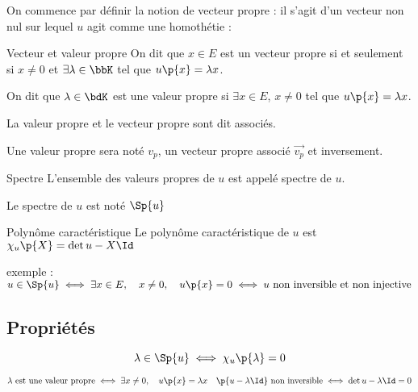 \documentclass[a4paper,french,bookmarks]{book}
\begin{document}
    On commence par définir la notion de vecteur propre : il s'agit d'un vecteur non nul sur lequel $u$ agit comme une homothétie :
    \begin{definition}{Vecteur et valeur propre}{}
        On dit que $x \in E$ est un vecteur propre si et seulement si $x \neq 0$ et $\exists \lambda \in \bbK$ tel que $u\p{x} = \lambda x$.
        
        On dit que $\lambda \in \bdK$ est une valeur propre si $\exists x \in E$, $x \neq 0$ tel que $u\p{x} = \lambda x$.
        
        La valeur propre et le vecteur propre sont dit associés.
    \end{definition}
    \begin{notation}
        Une valeur propre sera noté $v_p$, un vecteur propre associé $\vec{v_p}$ et inversement.
    \end{notation}
    
    \begin{definition}{Spectre}
        L'ensemble des valeurs propres de $u$ est appelé spectre de $u$.
    \end{definition}
    
    \begin{notation}
        Le spectre de $u$ est noté $\Sp{u}$
    \end{notation}
    
    \begin{definition}{Polynôme caractéristique}{}
        Le polynôme caractéristique de $u$ est $\chi_u\p{X} = \det{u - X\Id}$
    \end{definition}
    
    exemple : $u \in \Sp{u} \iff \exists x \in E,\quad x \neq 0,\quad u\p{x} = 0\iff u \ \text{non inversible et non injective}$
    
    \subsection{Propriétés}
    
    \begin{property}{}{}
        \[ \lambda \in \Sp{u} \iff \chi_u\p{\lambda} = 0\]
    \end{property}
    \begin{nproof}
        \[ \lambda \ \text{est une valeur propre} \iff \exists x \neq 0,\quad u\p{x} = \lambda x \quad \p{u - \lambda \Id} \ \text{non inversible} \iff \det{u - \lambda \Id} = 0\]
    \end{nproof}
    
\end{document}

